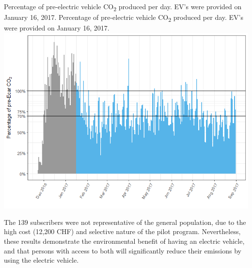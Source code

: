 \createfigure%
{Percentage of pre-electric vehicle CO\textsubscript{2} produced per day. EV's were provided on January 16, 2017. }%
{Percentage of pre-electric vehicle CO\textsubscript{2} produced per day. EV's were provided on January 16, 2017. }%
{\label{fig:green-class-reduction}}%
{\includegraphics[width=1.0\textwidth, angle=0]{figures/green_class_pollutant_reductions_daily}}%
{}

The 139 subscribers were not representative of the general population, due to the high cost (12,200 CHF) and selective nature of the pilot program.
Nevertheless, these results demonstrate the environmental benefit of having an electric vehicle, and that persons with access to both will significantly reduce their emissions by using the electric vehicle.

